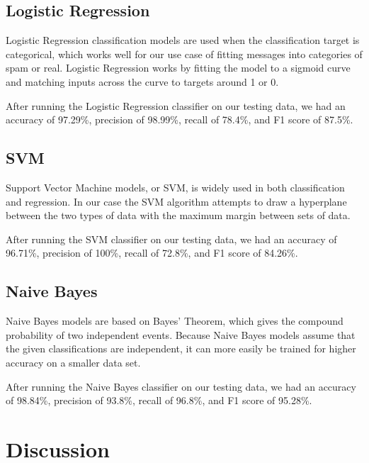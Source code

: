 \documentclass{article}
\begin{document}
\subsection{Logistic Regression}
Logistic Regression classification models are used when the classification target is categorical, which works well for our use case of fitting messages into categories of spam or real. Logistic Regression works by fitting the model to a sigmoid curve and matching inputs across the curve to targets around 1 or 0. 

After running the Logistic Regression classifier on our testing data, we had an accuracy of 97.29\%, precision of 98.99\%, recall of 78.4\%, and F1 score of 87.5\%.

\subsection{SVM}
Support Vector Machine models, or SVM, is widely used in both classification and regression. In our case the SVM algorithm attempts to draw a hyperplane between the two types of data with the maximum margin between sets of data.

After running the SVM classifier on our testing data, we had an accuracy of 96.71\%, precision of 100\%, recall of 72.8\%, and F1 score of 84.26\%.

\subsection{Naive Bayes}
Naive Bayes models are based on Bayes’ Theorem, which gives the compound probability of two independent events. Because Naive Bayes models assume that the given classifications are independent, it can more easily be trained for higher accuracy on a smaller data set.

After running the Naive Bayes classifier on our testing data, we had an accuracy of 98.84\%, precision of 93.8\%, recall of 96.8\%, and F1 score of 95.28\%.

\section{Discussion}
\end{document}
